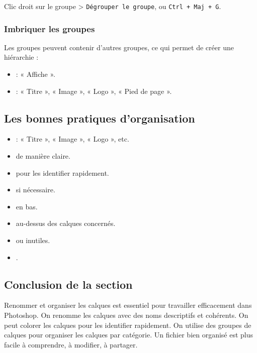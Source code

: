 Clic droit sur le groupe > \texttt{Dégrouper le groupe}, ou \texttt{Ctrl + Maj + G}.

\subsubsection{Imbriquer les groupes}

Les groupes peuvent contenir d'autres groupes, ce qui permet de créer une hiérarchie :

\begin{itemize}
    \item {} : « Affiche ».
    \item {} : « Titre », « Image », « Logo », « Pied de page ».
\end{itemize}

\subsection{Les bonnes pratiques d'organisation}

\begin{itemize}
    \item {} : « Titre », « Image », « Logo », etc.
    \item {} de manière claire.
    \item {} pour les identifier rapidement.
    \item {} si nécessaire.
    \item {} en bas.
    \item {} au-dessus des calques concernés.
    \item {} ou inutiles.
    \item {}.
\end{itemize}

\subsection*{Conclusion de la section}

Renommer et organiser les calques est essentiel pour travailler efficacement dans Photoshop. On renomme les calques avec des noms descriptifs et cohérents. On peut colorer les calques pour les identifier rapidement. On utilise des groupes de calques pour organiser les calques par catégorie. Un fichier bien organisé est plus facile à comprendre, à modifier, à partager.

